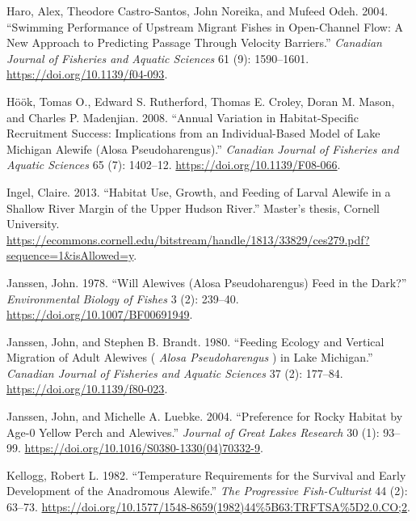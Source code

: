 \documentclass[
]{book}
\newlength{\cslhangindent}
\newlength{\cslentryspacingunit} %
\newenvironment{CSLReferences}[2] %
 {%
  \setlength{\parindent}{0pt}
  \ifodd #1
  \let\oldpar\par
  \def\par{\hangindent=\cslhangindent\oldpar}
  \fi
  \setlength{\parskip}{#2\cslentryspacingunit}
 }%
 {}
\begin{document}
\begin{CSLReferences}{1}{0}
\leavevmode{}%
Haro, Alex, Theodore Castro-Santos, John Noreika, and Mufeed Odeh. 2004. {``Swimming Performance of Upstream Migrant Fishes in Open-Channel Flow: A New Approach to Predicting Passage Through Velocity Barriers.''} \emph{Canadian Journal of Fisheries and Aquatic Sciences} 61 (9): 1590--1601. \url{https://doi.org/10.1139/f04-093}.

\leavevmode{}%
Höök, Tomas O., Edward S. Rutherford, Thomas E. Croley, Doran M. Mason, and Charles P. Madenjian. 2008. {``Annual Variation in Habitat-Specific Recruitment Success: Implications from an Individual-Based Model of {Lake} {Michigan} Alewife ({Alosa} Pseudoharengus).''} \emph{Canadian Journal of Fisheries and Aquatic Sciences} 65 (7): 1402--12. \url{https://doi.org/10.1139/F08-066}.

\leavevmode{}%
Ingel, Claire. 2013. {``Habitat {Use}, {Growth}, and {Feeding} of {Larval} {Alewife} in a {Shallow} {River} {Margin} of the {Upper} {Hudson} {River}.''} Master's thesis, Cornell University. \url{https://ecommons.cornell.edu/bitstream/handle/1813/33829/ces279.pdf?sequence=1\&isAllowed=y}.

\leavevmode{}%
Janssen, John. 1978. {``Will Alewives ({Alosa} Pseudoharengus) Feed in the Dark?''} \emph{Environmental Biology of Fishes} 3 (2): 239--40. \url{https://doi.org/10.1007/BF00691949}.

\leavevmode{}%
Janssen, John, and Stephen B. Brandt. 1980. {``Feeding {Ecology} and {Vertical} {Migration} of {Adult} {Alewives} ( \emph{{Alosa} Pseudoharengus} ) in {Lake} {Michigan}.''} \emph{Canadian Journal of Fisheries and Aquatic Sciences} 37 (2): 177--84. \url{https://doi.org/10.1139/f80-023}.

\leavevmode{}%
Janssen, John, and Michelle A. Luebke. 2004. {``Preference for {Rocky} {Habitat} by {Age}-0 {Yellow} {Perch} and {Alewives}.''} \emph{Journal of Great Lakes Research} 30 (1): 93--99. \url{https://doi.org/10.1016/S0380-1330(04)70332-9}.

\leavevmode{}%
Kellogg, Robert L. 1982. {``Temperature {Requirements} for the {Survival} and {Early} {Development} of the {Anadromous} {Alewife}.''} \emph{The Progressive Fish-Culturist} 44 (2): 63--73. \url{https://doi.org/10.1577/1548-8659(1982)44\%5B63:TRFTSA\%5D2.0.CO;2}.


\end{CSLReferences}
\end{document}
